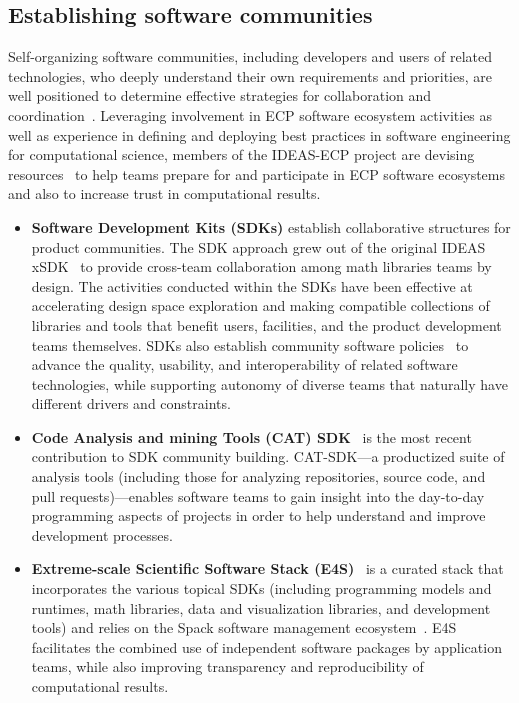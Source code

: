 \subsection*{Establishing software communities}  
Self-organizing software communities, including developers and users of related technologies, who deeply understand their own requirements and priorities, are well positioned to determine effective strategies for collaboration and coordination~\cite{CSCCE-website}.  Leveraging involvement in ECP software ecosystem activities as well as experience in defining and deploying best practices in software engineering for computational science, members of the IDEAS-ECP project are devising resources~\cite{sdk-tools} to help teams prepare for and participate in ECP software ecosystems and also to increase trust in computational results.

\begin{itemize}
\item {\bf Software Development Kits (SDKs)} establish collaborative structures for product communities. The SDK approach grew out of the original IDEAS xSDK~\cite{xSDKFoundations,yang2021xsdk,xsdk:homepage,xSDK-community-package-policies2016} to provide cross-team collaboration among math libraries teams by design. The activities conducted within the SDKs have been effective at accelerating design space exploration and making compatible collections of libraries and tools that benefit users, facilities, and the product development teams themselves. 
SDKs also establish community software policies~\cite{yang2019building,xsdk-policies:github} to advance the quality, usability, and interoperability of related software technologies, while supporting autonomy of diverse teams that naturally have different drivers and constraints. 

\item {\bf Code Analysis and mining Tools (CAT) SDK}~\cite{cat-sdk:homepage} is the most recent contribution to SDK community building. CAT-SDK---a productized suite of analysis tools (including those for analyzing repositories, source code, and pull requests)---enables software teams to gain insight into the day-to-day programming aspects of projects in order to help understand and improve development processes. 

\item {\bf Extreme-scale Scientific Software Stack (E4S)}~\cite{e4s-webpage,heroux2020e4s} is a curated stack that incorporates the various topical SDKs (including programming models and runtimes, math libraries, data and visualization libraries, and development tools) and relies on the Spack software management ecosystem~\cite{spack:homepage}.  E4S facilitates the combined use of independent software packages by application teams, while also improving transparency and reproducibility of computational results. 

\end{itemize}


